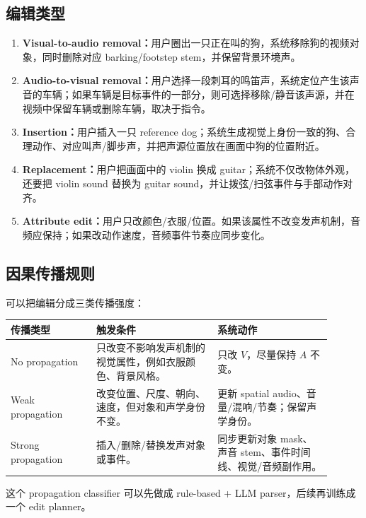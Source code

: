 \subsection{编辑类型}

\begin{enumerate}[leftmargin=2em]
  \item \textbf{Visual-to-audio removal：}用户圈出一只正在叫的狗，系统移除狗的视频对象，同时删除对应 barking/footstep stem，并保留背景环境声。
  \item \textbf{Audio-to-visual removal：}用户选择一段刺耳的鸣笛声，系统定位产生该声音的车辆；如果车辆是目标事件的一部分，则可选择移除/静音该声源，并在视频中保留车辆或删除车辆，取决于指令。
  \item \textbf{Insertion：}用户插入一只 reference dog；系统生成视觉上身份一致的狗、合理动作、对应叫声/脚步声，并把声源位置放在画面中狗的位置附近。
  \item \textbf{Replacement：}用户把画面中的 violin 换成 guitar；系统不仅改物体外观，还要把 violin sound 替换为 guitar sound，并让拨弦/扫弦事件与手部动作对齐。
  \item \textbf{Attribute edit：}用户只改颜色/衣服/位置。如果该属性不改变发声机制，音频应保持；如果改动作速度，音频事件节奏应同步变化。
\end{enumerate}

\subsection{因果传播规则}

可以把编辑分成三类传播强度：

\begin{longtable}{p{0.24\linewidth}p{0.34\linewidth}p{0.32\linewidth}}
\toprule
\textbf{传播类型} & \textbf{触发条件} & \textbf{系统动作} \\
\midrule
No propagation & 只改变不影响发声机制的视觉属性，例如衣服颜色、背景风格。 & 只改 $V$，尽量保持 $A$ 不变。 \\
\midrule
Weak propagation & 改变位置、尺度、朝向、速度，但对象和声学身份不变。 & 更新 spatial audio、音量/混响/节奏；保留声学身份。 \\
\midrule
Strong propagation & 插入/删除/替换发声对象或事件。 & 同步更新对象 mask、声音 stem、事件时间线、视觉/音频副作用。 \\
\bottomrule
\end{longtable}

这个 propagation classifier 可以先做成 rule-based + LLM parser，后续再训练成一个 edit planner。


